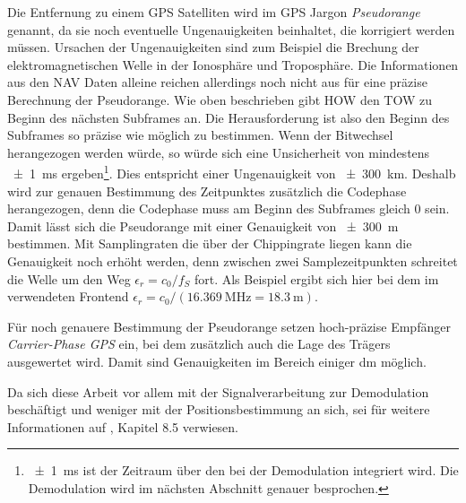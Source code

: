 Die Entfernung zu einem GPS Satelliten wird im GPS Jargon \emph{Pseudorange} genannt, da sie noch eventuelle Ungenauigkeiten beinhaltet, die korrigiert werden müssen. Ursachen der Ungenauigkeiten sind zum Beispiel die Brechung der elektromagnetischen Welle in der Ionosphäre und Troposphäre. Die Informationen aus den NAV Daten alleine reichen allerdings noch nicht aus für eine präzise Berechnung der Pseudorange. Wie oben beschrieben gibt \gls{HOW} den \gls{TOW} zu Beginn des nächsten Subframes an. Die Herausforderung ist also den Beginn des Subframes so präzise wie möglich zu bestimmen. Wenn der Bitwechsel herangezogen werden würde, so würde sich eine Unsicherheit von mindestens \SI{\pm1}{\ms} ergeben\footnote{\SI{\pm1}{\ms} ist der Zeitraum über den bei der Demodulation integriert wird. Die Demodulation wird im nächsten Abschnitt genauer besprochen.}. Dies entspricht einer Ungenauigkeit von \SI{\pm300}{\kilo\meter}. Deshalb wird zur genauen Bestimmung des Zeitpunktes zusätzlich die Codephase herangezogen, denn die Codephase muss am Beginn des Subframes gleich $0$ sein. Damit lässt sich die Pseudorange mit einer Genauigkeit von \SI{\pm300}{\meter} bestimmen. Mit Samplingraten die über der Chippingrate liegen kann die Genauigkeit noch erhöht werden, denn zwischen zwei Samplezeitpunkten schreitet die Welle um den Weg $\epsilon_{r} = c_0/f_S$ fort. Als Beispiel ergibt sich hier bei dem im \dscubesat verwendeten Frontend $\epsilon_{r} = c_0/(\SI{16.369}{\MHz}=\SI{18.3}{\meter})$. 

Für noch genauere Bestimmung der Pseudorange setzen hoch-präzise Empfänger \emph{Carrier-Phase GPS} ein, bei dem zusätzlich auch die Lage des Trägers ausgewertet wird. Damit sind Genauigkeiten im Bereich einiger \si{\deci\meter} möglich.

Da sich diese Arbeit vor allem mit der Signalverarbeitung zur Demodulation beschäftigt und weniger mit der Positionsbestimmung an sich, sei für weitere Informationen auf \cite{borre2007software}, Kapitel 8.5 verwiesen.

